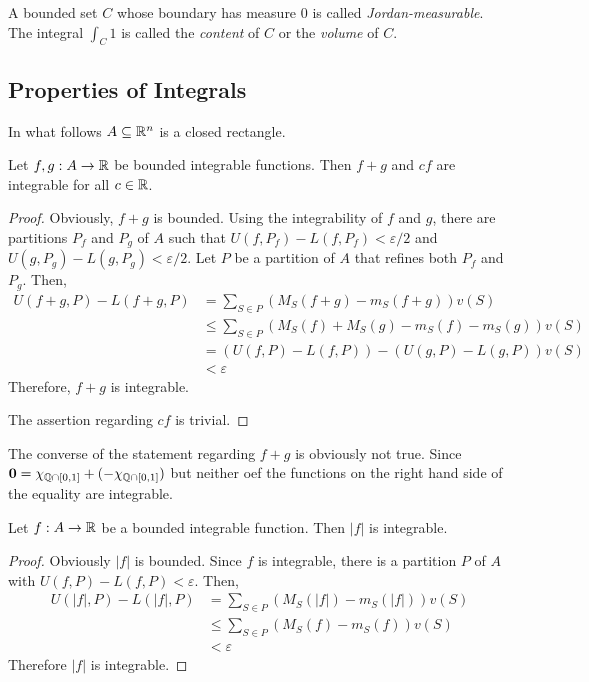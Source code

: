 \begin{definition}
    A bounded set $C$ whose boundary has measure $0$ is called \textit{Jordan-measurable}. The integral $\int_C1$ is called the \textit{content} of $C$ or the \textit{volume} of $C$.
\end{definition}

\subsection{Properties of Integrals}

In what follows $A\subseteq\mathbb{R}^n$ is a closed rectangle.

\begin{proposition}
    Let $f,g:A\to\mathbb{R}$ be bounded integrable functions. Then $f + g$ and $cf$ are integrable for all $c\in\mathbb{R}$.
\end{proposition}
\begin{proof}
    Obviously, $f + g$ is bounded. Using the integrability of $f$ and $g$, there are partitions $P_f$ and $P_g$ of $A$ such that $U(f,P_f) - L(f,P_f) < \varepsilon/2$ and $U(g,P_g) - L(g,P_g) < \varepsilon/2$. Let $P$ be a partition of $A$ that refines both $P_f$ and $P_g$. Then, 
    \begin{align*}
        U(f + g,P) - L(f + g, P) &= \sum_{S\in P}(M_S(f + g) - m_S(f + g))v(S)\\
        &\le\sum_{S\in P}(M_S(f) + M_S(g) - m_S(f) - m_S(g))v(S)\\
        &= \left(U(f, P) - L(f, P)\right) - \left(U(g, P) - L(g, P)\right)v(S)\\
        &< \varepsilon
    \end{align*}
    Therefore, $f + g$ is integrable.

    The assertion regarding $cf$ is trivial.
\end{proof}

The converse of the statement regarding $f + g$ is obviously not true. Since $\mathbf{0} = \chi_{\mathbb{Q}\cap[0,1]} + (-\chi_{\mathbb{Q}\cap[0,1]})$ but neither oef the functions on the right hand side of the equality are integrable.

\begin{lemma}
    Let $f:A\to\mathbb{R}$ be a bounded integrable function. Then $|f|$ is integrable.
\end{lemma}
\begin{proof}
    Obviously $|f|$ is bounded. Since $f$ is integrable, there is a partition $P$ of $A$ with $U(f, P) - L(f,P) < \varepsilon$. Then, 
    \begin{align*}
        U(|f|, P) - L(|f|, P) &= \sum_{S\in P}(M_S(|f|) - m_S(|f|))v(S)\\
        &\le\sum_{S\in P}(M_S(f) - m_S(f))v(S)\\
        &< \varepsilon
    \end{align*}
    Therefore $|f|$ is integrable.
\end{proof}

